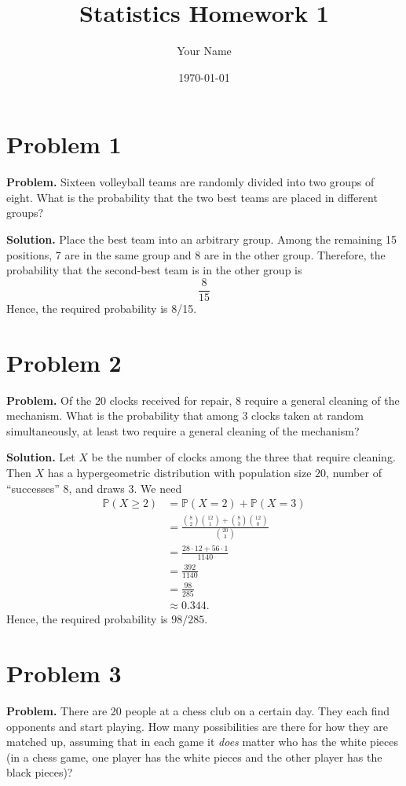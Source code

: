 \documentclass{article}
\title{Statistics Homework 1}
\author{Your Name}
\date{\today}
\begin{document}
\maketitle

\section{Problem 1}

\textbf{Problem.} Sixteen volleyball teams are randomly divided into two groups of eight. What is the probability that the two best teams are placed in different groups?

\textbf{Solution.} Place the best team into an arbitrary group. Among the remaining 15 positions, 7 are in the same group and 8 are in the other group. Therefore, the probability that the second-best team is in the other group is
\[
\frac{8}{15}
\]
Hence, the required probability is 8/15.
\section{Problem 2}

\textbf{Problem.} Of the 20 clocks received for repair, 8 require a general cleaning of the mechanism. What is the probability that among 3 clocks taken at random simultaneously, at least two require a general cleaning of the mechanism?

\textbf{Solution.} Let $X$ be the number of clocks among the three that require cleaning. Then $X$ has a hypergeometric distribution with population size $20$, number of ``successes'' $8$, and draws $3$. We need
\begin{align*}
\mathbb{P}(X \ge 2) &= \mathbb{P}(X=2) + \mathbb{P}(X=3) \\
&= \frac{\binom{8}{2}\binom{12}{1} + \binom{8}{3}\binom{12}{0}}{\binom{20}{3}} \\
&= \frac{28\cdot 12 + 56\cdot 1}{1140} \\
&= \frac{392}{1140} \\
&= \frac{98}{285} \\
&\approx 0.344.
\end{align*}
Hence, the required probability is $98/285$.
\section{Problem 3}

\textbf{Problem.} There are 20 people at a chess club on a certain day. They each find opponents and start playing. How many possibilities are there for how they are matched up, assuming that in each game it \emph{does} matter who has the white pieces (in a chess game, one player has the white pieces and the other player has the black pieces)?
\end{document}
